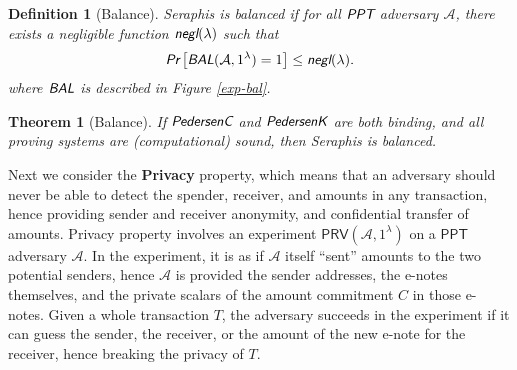 \documentclass{article}
\theoremstyle{plain}
\newtheorem{definition}{Definition}[section]
\newtheorem{theorem}{Theorem}[section]
\theoremstyle{remark}
\begin{document}
\begin{definition}[Balance]
Seraphis is balanced if for all $\emph{\textsf{PPT}}$ adversary $\mathcal{A}$, there exists a negligible function $\emph{\textsf{negl}}(\lambda)$ such that
\begin{align*}
\emph{\textsf{Pr}}
\left[
\emph{\textsf{BAL}}(\mathcal{A}, 1^{\lambda})=1
\right]
\le \emph{\textsf{negl}}(\lambda).
\end{align*}
where $\emph{\textsf{BAL}}$ is described in Figure \ref{exp-bal}.
\end{definition}
\begin{theorem}[Balance]\label{thm-bal}
If $\emph{\textsf{PedersenC}}$ and $\emph{\textsf{PedersenK}}$ are both binding, and all proving systems are (computational) sound, then Seraphis is balanced.  
\end{theorem}
Next we consider the \textbf{Privacy} property, which means that an adversary should never be able to detect the spender, receiver, and amounts in any transaction, hence providing sender and receiver anonymity, and confidential transfer of amounts. Privacy property involves an experiment $\textsf{PRV}(\mathcal{A}, 1^{\lambda})$ on a $\textsf{PPT}$ adversary $\mathcal{A}$. In the experiment, it is as if $\mathcal{A}$ itself ``sent'' amounts to the two potential senders, hence $\mathcal{A}$ is provided the sender addresses, the e-notes themselves, and the private scalars of the amount commitment $C$ in those e-notes. Given a whole transaction $T$, the adversary succeeds in the experiment if it can guess the sender, the receiver, or the amount of the new e-note for the receiver, hence breaking the privacy of $T$.
\end{document}
